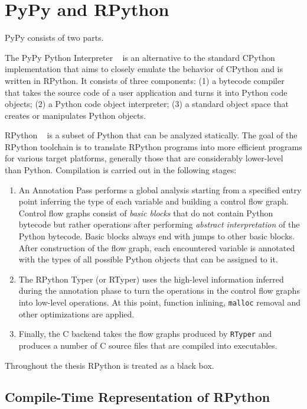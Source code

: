 \chapter{PyPy and RPython}
PyPy consists of two parts.

The PyPy Python Interpreter ~\cite{pypy-intro} is an alternative to the standard CPython implementation that aims to closely emulate the behavior of CPython and is written in RPython. It consists of three components: (1) a bytecode compiler that takes the source code of a user application and turns it into Python code objects; (2) a Python code object interpreter; (3) a standard object space that creates or manipulates Python objects.

RPython ~\cite{rpython-doc} is a subset of Python that can be analyzed statically. The goal of the RPython toolchain is to translate RPython programs into more efficient programs for various target platforms, generally those that are considerably lower-level than Python. Compilation is carried out in the following stages:

\begin{enumerate}
\item An Annotation Pass performs a global analysis starting from a specified entry point inferring the type of each variable and building a control flow graph. Control flow graphs consist of \textit{basic blocks} that do not contain Python bytecode but rather operations after performing \textit{abstract interpretation} of the Python bytecode. Basic blocks always end with jumps to other basic blocks. After construction of the flow graph, each encountered variable is annotated with the types of all possible Python objects that can be assigned to it.

\item
The RPython Typer (or RTyper) uses the high-level information inferred during the annotation phase to turn the operations in the control flow graphs into low-level operations. At this point, function inlining, \texttt{malloc} removal and other optimizations are applied.

\item
Finally, the C backend takes the flow graphs produced by \texttt{RTyper} and produces a number of C source files that are compiled into executables.
\end{enumerate}

Throughout the thesis RPython is treated as a black box.

\section{Compile-Time Representation of RPython}

